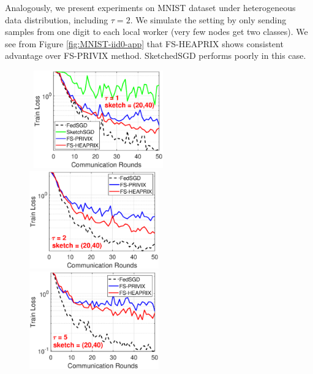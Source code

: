 \documentclass[twoside]{article}
\begin{document}
Analogously, we present experiments on MNIST dataset under heterogeneous data distribution, including $\tau=2$. We simulate the setting by only sending samples from one digit to each local worker (very few nodes get two classes). We see from Figure \ref{fig:MNIST-iid0-app} that FS-HEAPRIX shows consistent advantage over FS-PRIVIX method. SketchedSGD performs poorly in this case.

\begin{figure}[H]
	\begin{center}
		\mbox{\hspace{-0.15in}			   
		\includegraphics[width=2.2in]{MNIST_figures/local1_sketch20_iid0_train_loss.eps} \hspace{-0.15in}
		\includegraphics[width=2.2in]{MNIST_figures/local2_sketch20_iid0_train_loss.eps} \hspace{-0.15in}
		\includegraphics[width=2.2in]{MNIST_figures/local5_sketch20_iid0_train_loss.eps} }
		

\end{center}
\end{figure}
\end{document}
